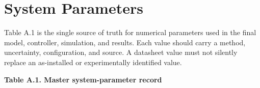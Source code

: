 \chapter{System Parameters}\label{ch:system-parameters}

Table A.1 is the single source of truth for numerical parameters used in
the final model, controller, simulation, and results. Each value should
carry a method, uncertainty, configuration, and source. A datasheet
value must not silently replace an as-installed or experimentally
identified value.

\clearpage
\begin{landscape}
\par\medskip\noindent\singlespacing
{}
\textbf{Table A.1. Master system-parameter record}\par


\end{landscape}
